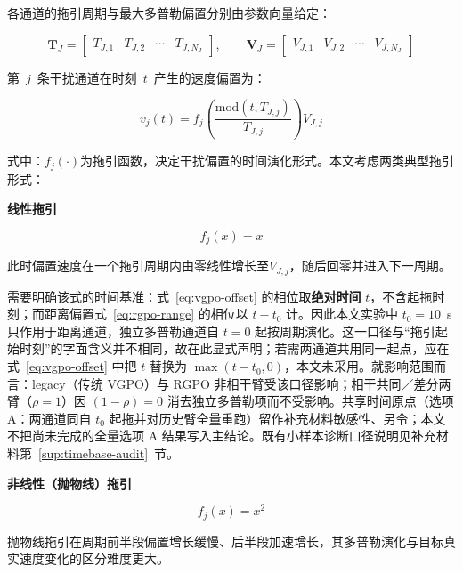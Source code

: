\documentclass[UTF8,a4paper,zihao=-4]{ctexart}
\begin{document}
各通道的拖引周期与最大多普勒偏置分别由参数向量给定：


\begin{equation}
\mathbf{T}_J=\begin{bmatrix}T_{J,1}&T_{J,2}&\cdots&T_{J,N_J}\end{bmatrix},\qquad
\mathbf{V}_J=\begin{bmatrix}V_{J,1}&V_{J,2}&\cdots&V_{J,N_J}\end{bmatrix}
\label{eq:vgpo-TV}
\end{equation}


第~\(j\)~条干扰通道在时刻~\(t\)~产生的速度偏置为：


\begin{equation}
v_j(t)=f_j\!\left(\frac{\mathrm{mod}(t,T_{J,j})}{T_{J,j}}\right)V_{J,j}
\label{eq:vgpo-offset}
\end{equation}


式中：\(f_j(\cdot)\)为拖引函数，决定干扰偏置的时间演化形式。本文考虑两类典型拖引形式：

\noindent\textbf{线性拖引}\par


\begin{equation}
f_j(x)=x
\label{eq:vgpo-linear}
\end{equation}


此时偏置速度在一个拖引周期内由零线性增长至\(V_{J,j}\)，随后回零并进入下一周期。

需要明确该式的时间基准：式~\eqref{eq:vgpo-offset} 的相位取\textbf{绝对时间} \(t\)，不含起拖时刻；而距离偏置式~\eqref{eq:rgpo-range} 的相位以 \(t-t_0\) 计。因此本文实验中 \(t_0=10\)~s 只作用于距离通道，独立多普勒通道自 \(t=0\) 起按周期演化。这一口径与“拖引起始时刻”的字面含义并不相同，故在此显式声明；若需两通道共用同一起点，应在式~\eqref{eq:vgpo-offset} 中把 \(t\) 替换为 \(\max(t-t_0,0)\)，本文未采用。就影响范围而言：legacy（传统 VGPO）与 RGPO 非相干臂受该口径影响；相干共同／差分两臂（\(\rho=1\)）因 \((1-\rho)=0\) 消去独立多普勒项而不受影响。共享时间原点（选项 A：两通道同自 \(t_0\) 起拖并对历史臂全量重跑）留作补充材料敏感性、另令；本文不把尚未完成的全量选项 A 结果写入主结论。既有小样本诊断口径说明见补充材料第~\ref{sup:timebase-audit}~节。

\noindent\textbf{非线性（抛物线）拖引}\par


\begin{equation}
f_j(x)=x^2
\label{eq:vgpo-parab}
\end{equation}


抛物线拖引在周期前半段偏置增长缓慢、后半段加速增长，其多普勒演化与目标真实速度变化的区分难度更大。
\end{document}
